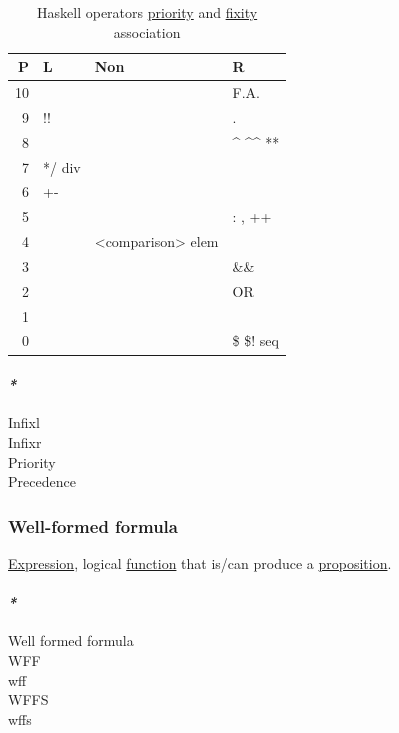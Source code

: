 \documentclass[11pt]{article}
\begin{document}
\begin{table}[htbp]
\caption{\label{tab:haskell-operator-priority-fixity-association}Haskell operators \hyperref[org8cf8667]{priority} and \hyperref[org561ae24]{fixity} association}
\centering
\begin{tabular}{rlll}
P & L & Non & R\\
\hline
10 &  &  & F.A.\\
9 & !! &  & .\\
8 &  &  & \^{} \^{}\^{} **\\
7 & */ div &  & \\
6 & +- &  & \\
5 &  &  & : , ++\\
4 &  & <comparison> elem & \\
3 &  &  & \&\&\\
2 &  &  & OR\\
1 &  &  & \\
0 &  &  & \$ \$! seq\\
\end{tabular}
\end{table}

\paragraph{\emph{*}}
\label{sec:orga56ff09}

\label{org8104c05}Infixl\\
\label{org9ee2b98}Infixr\\
\label{org8cf8667}Priority\\
\label{orgb0d1e87}Precedence\\

\subsubsection{\label{org8f386b7}Well-formed formula}
\label{sec:org3e5199c}
\hyperref[org9021dd7]{Expression}, logical \hyperref[orge15bc14]{function} that is/can produce a \hyperref[org1e068ed]{proposition}.\\

\paragraph{\emph{*}}
\label{sec:orgba8d050}
\label{orgbff8b72}Well formed formula\\
\label{org7cbea4a}WFF\\
\label{org9d5f628}wff\\
\label{orgfaee0c4}WFFS\\
\label{org94927bd}wffs\\
\end{document}
